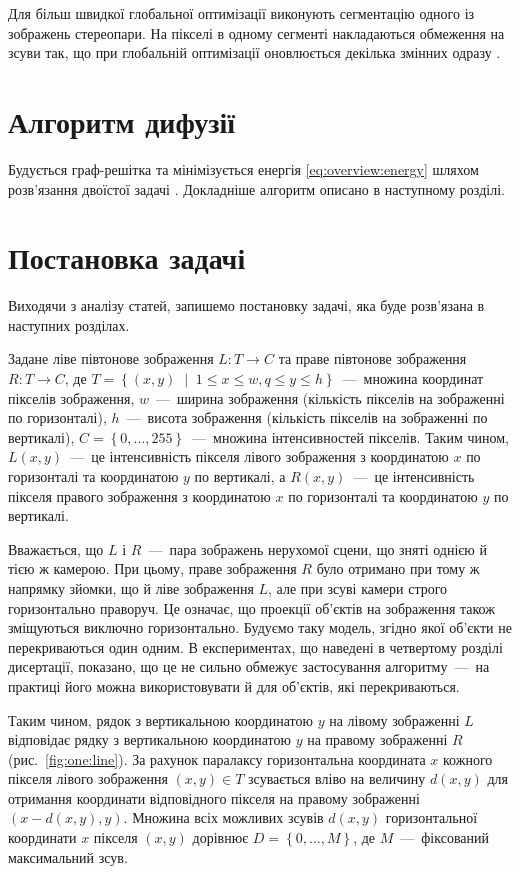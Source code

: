 Для більш швидкої глобальної оптимізації
виконують сегментацію одного із зображень стереопари.
На пікселі в одному сегменті накладаються обмеження на зсуви так,
що при глобальній оптимізації оновлюється декілька змінних одразу
\cite{overview:ferg:graphcut}.

\section{Алгоритм дифузії}

Будується граф-решітка та мінімізується енергія \eqref{eq:overview:energy}
шляхом розв'язання двоїстої задачі \cite{overview:savchynskyy:diffusion}.
Докладніше алгоритм описано в наступному розділі.

\section{Постановка задачі}

Виходячи з аналізу статей, запишемо постановку задачі,
яка буде розв'язана в наступних розділах.

Задане ліве півтонове зображення $L : T \to C$
та праве півтонове зображення $R : T \to C$,
де
$T = \left\{
    \left( x, y \right) \; \middle| \; 1 \le x \le w, q \le y \le h
\right\}$~---~множина координат пікселів зображення,
$w$~---~ширина зображення (кількість пікселів на зображенні по горизонталі),
$h$~---~висота зображення (кількість пікселів на зображенні по вертикалі),
$C = \left\{ 0, \dotsc, 255 \right\} $~---~множина інтенсивностей пікселів.
Таким чином,
$L \left(x, y \right)$~---~це інтенсивність пікселя лівого зображення
з координатою $x$ по горизонталі та координатою $y$ по вертикалі,
а $R \left( x, y \right)$~---~це інтенсивність пікселя правого зображення
з координатою $x$ по горизонталі та координатою $y$ по вертикалі.

Вважається, що $L$ і $R$~---~пара зображень нерухомої сцени,
що зняті однією й тією ж камерою.
При цьому, праве зображення $R$ було отримано при тому ж напрямку зйомки,
що й ліве зображення $L$, але при зсуві камери строго горизонтально праворуч.
Це означає,
що проекції об'єктів на зображення також зміщуються виключно горизонтально.
Будуємо таку модель, згідно якої об'єкти не перекриваються один одним.
В експериментах, що наведені в четвертому розділі дисертації, показано,
що це не сильно обмежує застосування алгоритму~---~на практиці його можна
використовувати й для об'єктів, які перекриваються.

Таким чином, рядок з вертикальною координатою $y$
на лівому зображенні $L$ відповідає
рядку з вертикальною координатою $y$ на правому зображенні $R$
(рис.~\ref{fig:one:line}).
За рахунок паралаксу горизонтальна координата $x$
кожного пікселя лівого зображення $\left( x, y \right) \in T$
зсувається вліво на величину $d \left(x, y \right) $
для отримання координати відповідного пікселя на правому зображенні
$\left( x - d \left(x, y \right), y \right)$.
Множина всіх можливих зсувів $d \left(x, y \right)$
горизонтальної координати $x$ пікселя $\left(x, y \right)$ дорівнює
$D = \left\{ 0, \dotsc, M \right\}$, де $M$~---~фіксований максимальний зсув.

